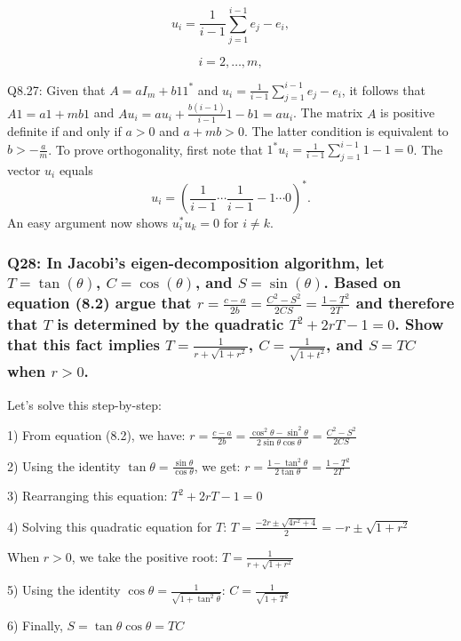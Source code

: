 \documentclass[8pt]{article}
\begin{document}
{\[ u_i = \frac{1}{i - 1} \sum_{j = 1}^{i - 1} e_j - e_i, \]

\[ i = 2, \ldots, m, \]


Q8.27: Given that \( A = aI_m + b11^* \) and \( u_i = \frac{1}{i-1} \sum_{j=1}^{i-1} e_j - e_i \), it follows that \( A1 = a1 + mb1 \) and \( Au_i = au_i + \frac{b(i-1)}{i-1} 1 - b1 = au_i \). The matrix \( A \) is positive definite if and only if \( a > 0 \) and \( a + mb > 0 \). The latter condition is equivalent to \( b > -\frac{a}{m} \). To prove orthogonality, first note that \( 1^* u_i = \frac{1}{i-1} \sum_{j=1}^{i-1} 1 - 1 = 0 \). The vector \( u_i \) equals
\[
u_i = \left( \frac{1}{i-1} \cdots \frac{1}{i-1} -1 \cdots 0 \right)^*.
\]
An easy argument now shows \( u_i^* u_k = 0 \) for \( i \ne k \).

\subsubsection*{Q28: In Jacobi’s eigen-decomposition algorithm, let \(T = \tan(\theta)\), \(C = \cos(\theta)\), and \(S = \sin(\theta)\). Based on equation (8.2) argue that \(r = \frac{c - a}{2b} = \frac{C^2 - S^2}{2CS} = \frac{1 - T^2}{2T}\) and therefore that \(T\) is determined by the quadratic \(T^2 + 2rT - 1 = 0\). Show that this fact implies \(T = \frac{1}{r + \sqrt{1 + r^2}}\), \(C = \frac{1}{\sqrt{1 + t^2}}\), and \(S = TC\) when \(r > 0\).}

Let's solve this step-by-step:

1) From equation (8.2), we have:
   $r = \frac{c - a}{2b} = \frac{\cos^2\theta - \sin^2\theta}{2\sin\theta\cos\theta} = \frac{C^2 - S^2}{2CS}$

2) Using the identity $\tan\theta = \frac{\sin\theta}{\cos\theta}$, we get:
   $r = \frac{1 - \tan^2\theta}{2\tan\theta} = \frac{1 - T^2}{2T}$

3) Rearranging this equation:
   $T^2 + 2rT - 1 = 0$

4) Solving this quadratic equation for $T$:
   $T = \frac{-2r \pm \sqrt{4r^2 + 4}}{2} = -r \pm \sqrt{1 + r^2}$

   When $r > 0$, we take the positive root:
   $T = \frac{1}{r + \sqrt{1 + r^2}}$

5) Using the identity $\cos\theta = \frac{1}{\sqrt{1 + \tan^2\theta}}$:
   $C = \frac{1}{\sqrt{1 + T^2}}$

6) Finally, $S = \tan\theta \cos\theta = TC$

}
\end{document}
